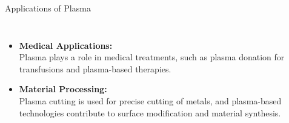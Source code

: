 \documentclass[13pt]{beamer}
\begin{document}
\begin{frame}[t,allowframebreaks]{Applications of Plasma}
\begin{columns}
		 	\begin{itemize}
		 	\item 	\textbf{Medical Applications:}\\
		 	Plasma plays a role in medical treatments, such as plasma donation for transfusions and plasma-based therapies.

		 	\item 	\textbf{	Material Processing:}\\
		 	Plasma cutting is used for precise cutting of metals, and plasma-based technologies contribute to surface modification and material synthesis.
		 \end{itemize}


		\end{columns}






\end{frame}
\end{document}
